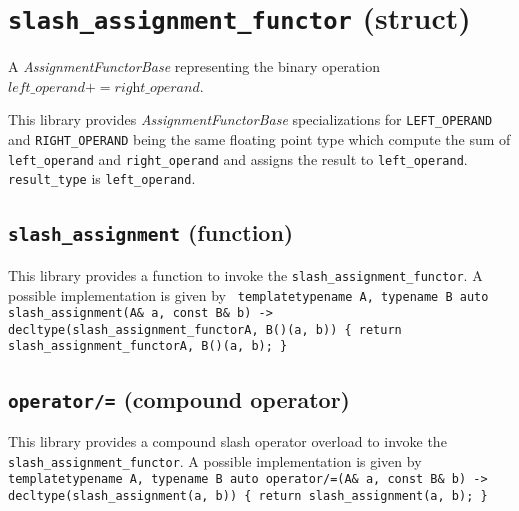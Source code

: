 \section{\texttt{slash\_assignment\_functor} (struct)}
A \textit{AssignmentFunctorBase} representing the binary operation $\textit{left\_operand} += \textit{right\_operand}$.\newline

\noindent{}This library provides \textit{AssignmentFunctorBase} specializations for
\texttt{LEFT\_OPERAND} and \texttt{RIGHT\_OPERAND} being the same    floating point
type which compute  the sum of  \texttt{left\_operand} and \texttt{right\_operand}
and assigns the result to \texttt{left\_operand}.
\texttt{result\_type} is \texttt{left\_operand}.

\subsection{\texttt{slash\_assignment} (function)}
This library provides a function to invoke the \texttt{slash\_assignment\_functor}.
A possible implementation is given by\newline
\texttt{
template\textlangle typename A, typename B\textrangle\newline
auto slash\_assignment(A\& a, const B\& b) -> decltype(slash\_assignment\_functor\textlangle A, B\textrangle()(a, b))\newline
\{ return slash\_assignment\_functor\textlangle A, B\textrangle()(a, b); \}
}

\subsection{\texttt{operator/=} (compound operator)}
This library provides a compound slash operator overload to invoke the \texttt{slash\_assignment\_functor}.
A possible implementation is given by\newline
\texttt{
template\textlangle typename A, typename B\textrangle\newline
auto operator/=(A\& a, const B\& b) -> decltype(slash\_assignment(a, b))\newline
\{ return slash\_assignment(a, b); \}
}